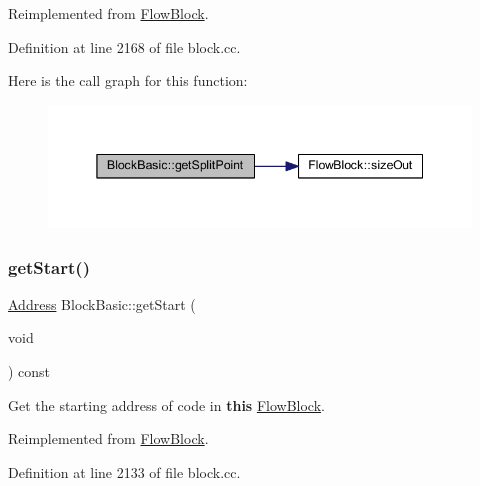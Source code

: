 Reimplemented from \mbox{\hyperlink{class_flow_block_a20996aacbad259e2e4a7bb0c72482335}{Flow\+Block}}.



Definition at line 2168 of file block.\+cc.

Here is the call graph for this function\+:
\nopagebreak
\begin{figure}[H]
\begin{center}
\leavevmode
\includegraphics[width=345pt]{class_block_basic_a22d7b010455f00b1bb1ff5efb3d00550_cgraph}
\end{center}
\end{figure}
\mbox{\label{class_block_basic_a779d71352d86f6af4342b419713c03d5}} 
\subsubsection{\texorpdfstring{getStart()}{getStart()}}
{\footnotesize\ttfamily \mbox{\hyperlink{class_address}{Address}} Block\+Basic\+::get\+Start (\begin{DoxyParamCaption}\item[{void}]{ }\end{DoxyParamCaption}) const\hspace{0.3cm}{\ttfamily [virtual]}}



Get the starting address of code in {\bfseries{this}} \mbox{\hyperlink{class_flow_block}{Flow\+Block}}. 



Reimplemented from \mbox{\hyperlink{class_flow_block_a4e2f7c4ce119ccb628c2609bc3a5b842}{Flow\+Block}}.



Definition at line 2133 of file block.\+cc.

